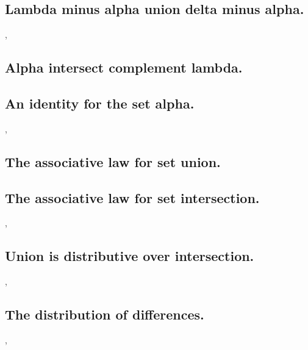 \documentclass[preview]{standalone}
\begin{document}
\subsection{Lambda minus alpha union delta minus alpha.}

\sep

\subsection{Alpha intersect complement lambda.}

\pagebreak


\subsection{An identity for the set alpha.}

\sep


\subsection{The associative law for set union.}

\pagebreak


\subsection{The associative law for set intersection.}

\sep


\subsection{Union is distributive over intersection.}

\sep
\pagebreak


\subsection{The distribution of differences.}

\sep
\pagebreak
\end{document}
